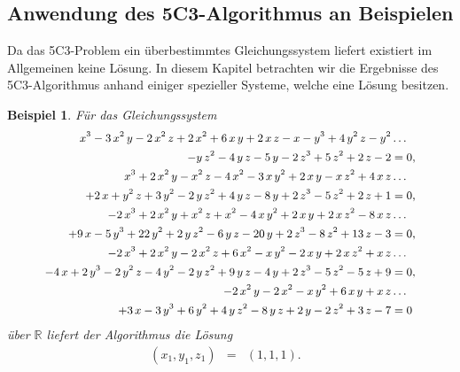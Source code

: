 \documentclass[a4paper,oneside, 11pt, openany%
]{article}
\newcommand{\R}{{\mathbb R}}
\theoremstyle{custom}
\theoremstyle{custom}
\newtheorem{example}{Beispiel}[section]
\begin{document}
\newpage
\subsection{Anwendung des 5C3-Algorithmus an Beispielen}\label{sec:5C3_examples}
Da das 5C3-Problem ein überbestimmtes Gleichungssystem liefert existiert im Allgemeinen keine Lösung. In diesem Kapitel betrachten wir die Ergebnisse des 5C3-Algorithmus anhand einiger spezieller Systeme, welche eine Lösung besitzen.
\begin{example}
	\label{ex:5C3_1}
	Für das Gleichungssystem
	\begin{equation*}\label{eqn:example5C3_1}
		\small
		\begin{alignedat}{1}
			x^3-3\,x^2\,y-2\,x^2\,z+2\,x^2+6\,x\,y+2\,x\,z-x-y^3+4\,y^2\,z-y^2&\ldots\\
			-y\,z^2-4\,y\,z-5\,y-2\,z^3+5\,z^2+2\,z-2&=0,\\ x^3+2\,x^2\,y-x^2\,z-4\,x^2-3\,x\,y^2+2\,x\,y-x\,z^2+4\,x\,z&\ldots\\
			+2\,x+y^2\,z+3\,y^2-2\,y\,z^2+4\,y\,z-8\,y+2\,z^3-5\,z^2+2\,z+1&=0,\\ -2\,x^3+2\,x^2\,y+x^2\,z+x^2-4\,x\,y^2+2\,x\,y+2\,x\,z^2-8\,x\,z&\ldots\\
			+9\,x-5\,y^3+22\,y^2+2\,y\,z^2-6\,y\,z-20\,y+2\,z^3-8\,z^2+13\,z-3&=0,\\ -2\,x^3+2\,x^2\,y-2\,x^2\,z+6\,x^2-x\,y^2-2\,x\,y+2\,x\,z^2+x\,z&\ldots\\
			-4\,x+2\,y^3-2\,y^2\,z-4\,y^2-2\,y\,z^2+9\,y\,z-4\,y+2\,z^3-5\,z^2-5\,z+9&=0,\\ -2\,x^2\,y-2\,x^2-x\,y^2+6\,x\,y+x\,z&\ldots\\
			+3\,x-3\,y^3+6\,y^2+4\,y\,z^2-8\,y\,z+2\,y-2\,z^2+3\,z-7&=0
		\end{alignedat}
	\end{equation*}
	über $\R$ liefert der Algorithmus die Lösung 
	\begin{equation*}
		\begin{alignedat}{5}
			&\left( x_{1},y_{1},z_{1}\right) &=& \left(1,1,1 \right).&&
		\end{alignedat}
	\end{equation*}
\end{example}
\end{document}
